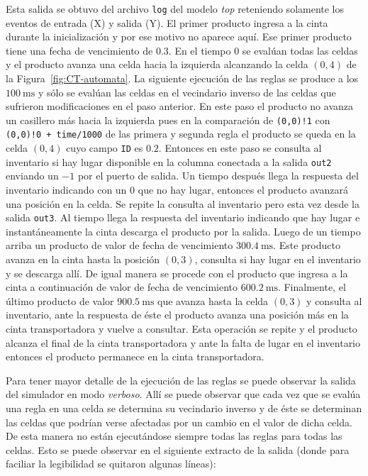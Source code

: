 \documentclass[10pt]{article}
\begin{document}
Esta salida se obtuvo del archivo \texttt{log} del modelo \textit{top} reteniendo solamente los eventos de entrada (X) y salida (Y). El primer producto ingresa a la cinta durante la inicialización y por ese motivo no aparece aquí. Ese primer producto tiene una fecha de vencimiento de $0.3$. En el tiempo $0$ se evalúan todas las celdas y el producto avanza una celda hacia la izquierda alcanzando la celda $(0,4)$ de la Figura~\ref{fig:CT-automata}. La siguiente ejecución de las reglas se produce a los $100~\textrm{ms}$ y sólo se evalúan las celdas en el vecindario inverso de las celdas que sufrieron modificaciones en el paso anterior. En este paso el producto no avanza un casillero más hacia la izquierda pues en la comparación de \texttt{(0,0)!1} con \texttt{(0,0)!0 + time/1000} de las primera y segunda regla el producto se queda en la celda $(0,4)$ cuyo campo \texttt{ID} es $0.2$. Entonces en este paso se consulta al inventario si hay lugar disponible en la columna conectada a la salida \texttt{out2} enviando un $-1$ por el puerto de salida. Un tiempo después llega la respuesta del inventario indicando con un $0$ que no hay lugar, entonces el producto avanzará una posición en la celda. Se repite la consulta al inventario pero esta vez desde la salida \texttt{out3}. Al tiempo llega la respuesta del inventario indicando que hay lugar e instantáneamente la cinta descarga el producto por la salida. Luego de un tiempo arriba un producto de valor de fecha de vencimiento $300.4~\textrm{ms}$. Este producto avanza en la cinta hasta la posición $(0,3)$, consulta si hay lugar en el inventario y se descarga allí. De igual manera se procede con el producto que ingresa a la cinta a continuación de valor de fecha de vencimiento $600.2~\textrm{ms}$. Finalmente, el último producto de valor $900.5~\textrm{ms}$ que avanza hasta la celda $(0,3)$ y consulta al inventario, ante la respuesta de éste el producto avanza una posición más en la cinta transportadora y vuelve a consultar. Esta operación se repite y el producto alcanza el final de la cinta transportadora y ante la falta de lugar en el inventario entonces el producto permanece en la cinta transportadora.

Para tener mayor detalle de la ejecución de las reglas se puede observar la salida del simulador en modo \textit{verboso}. Allí se puede observar que cada vez que se evalúa una regla en una celda se determina su vecindario inverso y de éste se determinan las celdas que podrían verse afectadas por un cambio en el valor de dicha celda. De esta manera no están ejecutándose siempre todas las reglas para todas las celdas. Esto se puede observar en el siguiente extracto de la salida (donde para faciliar la legibilidad se quitaron algunas líneas):
\end{document}
